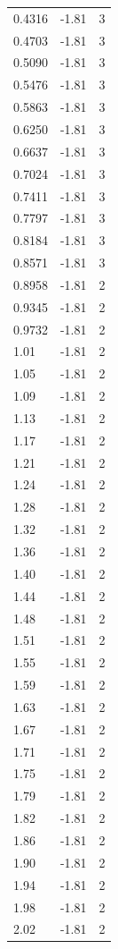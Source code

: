 \begin{longtable}{lrr}
  0.4316 & -1.81 & 3 \\
  0.4703 & -1.81 & 3 \\
  0.5090 & -1.81 & 3 \\
  0.5476 & -1.81 & 3 \\
  0.5863 & -1.81 & 3 \\
  0.6250 & -1.81 & 3 \\
  0.6637 & -1.81 & 3 \\
  0.7024 & -1.81 & 3 \\
  0.7411 & -1.81 & 3 \\
  0.7797 & -1.81 & 3 \\
  0.8184 & -1.81 & 3 \\
  0.8571 & -1.81 & 3 \\
  0.8958 & -1.81 & 2 \\
  0.9345 & -1.81 & 2 \\
  0.9732 & -1.81 & 2 \\
  1.01 & -1.81 & 2 \\
  1.05 & -1.81 & 2 \\
  1.09 & -1.81 & 2 \\
  1.13 & -1.81 & 2 \\
  1.17 & -1.81 & 2 \\
  1.21 & -1.81 & 2 \\
  1.24 & -1.81 & 2 \\
  1.28 & -1.81 & 2 \\
  1.32 & -1.81 & 2 \\
  1.36 & -1.81 & 2 \\
  1.40 & -1.81 & 2 \\
  1.44 & -1.81 & 2 \\
  1.48 & -1.81 & 2 \\
  1.51 & -1.81 & 2 \\
  1.55 & -1.81 & 2 \\
  1.59 & -1.81 & 2 \\
  1.63 & -1.81 & 2 \\
  1.67 & -1.81 & 2 \\
  1.71 & -1.81 & 2 \\
  1.75 & -1.81 & 2 \\
  1.79 & -1.81 & 2 \\
  1.82 & -1.81 & 2 \\
  1.86 & -1.81 & 2 \\
  1.90 & -1.81 & 2 \\
  1.94 & -1.81 & 2 \\
  1.98 & -1.81 & 2 \\
  2.02 & -1.81 & 2 \\

\end{longtable}
